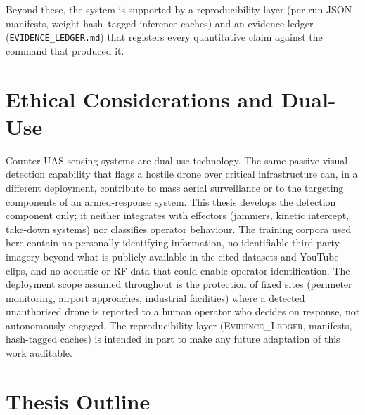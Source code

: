 \documentclass[12pt,a4paper,oneside,openright]{book}
\begin{document}
\begin{enumerate}
\end{enumerate}

Beyond these, the system is supported by a reproducibility layer (per-run JSON manifests, weight-hash--tagged inference caches) and an evidence ledger (\texttt{EVIDENCE\_LEDGER.md}) that registers every quantitative claim against the command that produced it.

\section{Ethical Considerations and Dual-Use}
\label{sec:ethics}

Counter-UAS sensing systems are dual-use technology. The same passive visual-detection capability that flags a hostile drone over critical infrastructure can, in a different deployment, contribute to mass aerial surveillance or to the targeting components of an armed-response system. This thesis develops the detection component only; it neither integrates with effectors (jammers, kinetic intercept, take-down systems) nor classifies operator behaviour. The training corpora used here contain no personally identifying information, no identifiable third-party imagery beyond what is publicly available in the cited datasets and YouTube clips, and no acoustic or RF data that could enable operator identification. The deployment scope assumed throughout is the protection of fixed sites (perimeter monitoring, airport approaches, industrial facilities) where a detected unauthorised drone is reported to a human operator who decides on response, not autonomously engaged. The reproducibility layer (\textsc{Evidence\_Ledger}, manifests, hash-tagged caches) is intended in part to make any future adaptation of this work auditable.

\section{Thesis Outline}
\label{sec:outline}
\end{document}
